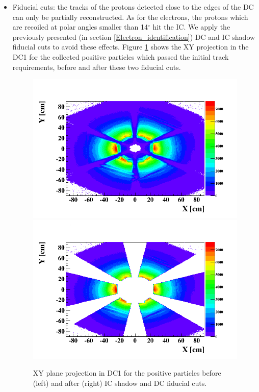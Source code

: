 \begin{itemize}
\item Fiducial cuts: the tracks of the protons detected close to the edges of the DC can only be partially reconstructed. As for the electrons, the protons which are recoiled at polar angles smaller than 14$^{\circ}$ hit the IC. We apply the previously presented (in section \ref{Electron_identification}) DC and IC shadow fiducial cuts to avoid these effects. Figure \ref{fig:proton_DC_IC_cut} shows the XY projection in the DC1 for the collected positive particles which passed the initial track requirements, before and after these two fiducial cuts.
\begin{figure}[tp]
\hspace{-0.2in}
\includegraphics[scale=0.35]{fig_analysis/proton_DC_IC_XY_1.png}
\includegraphics[scale=0.35]{fig_analysis/proton_DC_IC_XY_3.png}
\caption{XY plane projection in DC1 for the positive particles before (left) and after (right) IC shadow and DC fiducial cuts.} 
\label{fig:proton_DC_IC_cut}
\end{figure}
 

\end{itemize}
